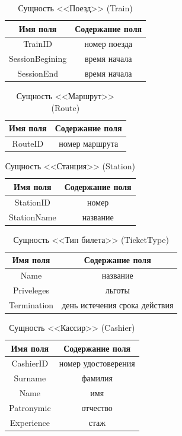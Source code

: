 \documentclass[a4paper,10pt]{article}
\theoremstyle{plain} %
\theoremstyle{definition} %
\theoremstyle{remark} %
\theoremstyle{definition}
\begin{document}
\begin{table}[h!]
\centering
\begin{tabular}{|c|c|}
    \hline
    Имя поля & Содержание поля \\
    \hline
    TrainID & номер поезда \\
    SessionBegining & время начала  \\
    SessionEnd & время начала  \\
    \hline
\end{tabular}
    \caption{Сущность <<Поезд>> (Train)}
\end{table}

\begin{table}[h!]
\centering
\begin{tabular}{|c|c|}
    \hline
    Имя поля & Содержание поля\\
    \hline
    RouteID & номер маршрута \\
    \hline
\end{tabular}
    \caption{Сущность <<Маршрут>> (Route)}
\end{table}

\begin{table}[h!]
\centering
\begin{tabular}{|c|c|}
    \hline
    Имя поля & Содержание поля \\
    \hline
    StationID & номер \\
    StationName & название  \\
    \hline
\end{tabular}
    \caption{Сущность <<Станция>> (Station)}
\end{table}



\begin{table}[h!]
\centering
\begin{tabular}{|c|c|}
\hline
    Имя поля & Содержание поля \\
    \hline
    Name & название \\
    Priveleges & льготы \\
    Termination & день истечения срока действия \\
    \hline
\end{tabular}
    \caption{Сущность <<Тип билета>> (TicketType)}
\end{table}

\begin{table}[h!]
\centering
\begin{tabular}{|c|c|}
\hline
    Имя поля & Содержание поля \\
    \hline
    CashierID & номер удостоверения \\
    Surname & фамилия \\
    Name & имя \\
    Patronymic & отчество  \\
    Experience & стаж \\
    \hline
\end{tabular}
    \caption{Сущность <<Кассир>> (Cashier)}
\end{table}
\end{document}
